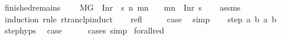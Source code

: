\begin{isabellebody}
\endisatagproof
{\isafoldproof}%
%
\isadelimproof
\isanewline
%
\endisadelimproof
\isanewline
{}\isamarkupfalse%
\ finished{\isacharunderscore}{\kern0pt}remains{\isacharcolon}{\kern0pt}\ \isanewline
\ \ \ {\isachardoublequoteopen}M{\isacharcomma}{\kern0pt}{\isasymLambda}{\isacharcomma}{\kern0pt}{\isasymGamma}{\isacharcomma}{\kern0pt}{\isasymOmega}{\isacharcomma}{\kern0pt}G\ {\isasymturnstile}\ {\isacharparenleft}{\kern0pt}Inr\ {\isacharparenleft}{\kern0pt}{\isacharparenright}{\kern0pt}{\isacharcomma}{\kern0pt}\ s{\isacharparenright}{\kern0pt}\ {\isacharminus}{\kern0pt}n{\isasymrightarrow}{\isacharasterisk}{\kern0pt}\ {\isacharparenleft}{\kern0pt}m{\isacharprime}{\kern0pt}{\isacharcomma}{\kern0pt}n{\isacharprime}{\kern0pt}{\isacharparenright}{\kern0pt}{\isachardoublequoteclose}\isanewline
\ \ \ {\isachardoublequoteopen}{\isacharparenleft}{\kern0pt}m{\isacharprime}{\kern0pt}{\isacharcomma}{\kern0pt}n{\isacharprime}{\kern0pt}{\isacharparenright}{\kern0pt}\ {\isacharequal}{\kern0pt}\ {\isacharparenleft}{\kern0pt}Inr{\isacharparenleft}{\kern0pt}{\isacharparenright}{\kern0pt}{\isacharcomma}{\kern0pt}\ s{\isacharparenright}{\kern0pt}{\isachardoublequoteclose}\isanewline
%
\isadelimproof
\ \ %
\endisadelimproof
%
\isatagproof
{}\isamarkupfalse%
\ assms\isanewline
{}\isamarkupfalse%
\ {\isacharparenleft}{\kern0pt}induction\ rule{\isacharcolon}{\kern0pt}\ rtranclp{\isacharunderscore}{\kern0pt}induct{}{\isacharparenright}{\kern0pt}\isanewline
\ \ \isamarkupfalse%
\ refl\isanewline
\ \ \isamarkupfalse%
\ \isamarkupfalse%
\ {\isacharquery}{\kern0pt}case\ \isamarkupfalse%
\ simp\isanewline
{}\isamarkupfalse%
\isanewline
\ \ \isamarkupfalse%
\ {\isacharparenleft}{\kern0pt}step\ a\ b\ a{\isacharprime}{\kern0pt}\ b{\isacharprime}{\kern0pt}{\isacharparenright}{\kern0pt}\isanewline
\ \ \isamarkupfalse%
\ step{\isachardot}{\kern0pt}hyps{\isacharparenleft}{\kern0pt}{}{\isacharparenright}{\kern0pt}\ \isamarkupfalse%
\ {\isacharquery}{\kern0pt}case\isanewline
\ \ \ \ \isamarkupfalse%
\ {\isacharparenleft}{\kern0pt}cases{\isacharsemicolon}{\kern0pt}\ simp{\isacharparenright}{\kern0pt}\isanewline
{}\isamarkupfalse%
%
\endisatagproof
{\isafoldproof}%
%
\isadelimproof
\isanewline
%
\endisadelimproof
\isanewline
{}\isamarkupfalse%
\ forall{\isacharunderscore}{\kern0pt}red{\isacharcolon}{\kern0pt}\isanewline

\end{isabellebody}
